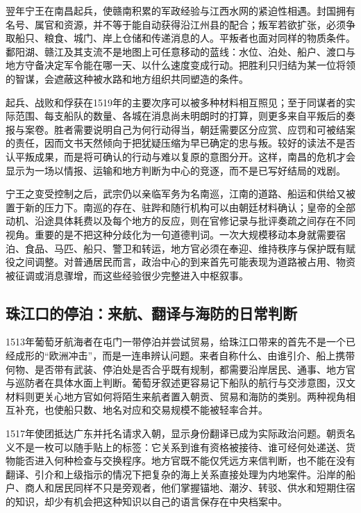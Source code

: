 翌年宁王在南昌起兵，使赣南积累的军政经验与江西水网的紧迫性相遇。封国拥有名号、属官和资源，并不等于能自动获得沿江州县的配合；叛军若欲扩张，必须争取船只、粮食、城门、岸上仓储和传递消息的人。平叛者也面对同样的物质条件。鄱阳湖、赣江及其支流不是地图上可任意移动的蓝线：水位、泊处、船户、渡口与地方守备决定军令能在哪一天、以什么速度变成行动。把胜利只归结为某一位将领的智谋，会遮蔽这种被水路和地方组织共同塑造的条件。

起兵、战败和俘获在1519年的主要次序可以被多种材料相互照见；至于同谋者的实际范围、每支船队的数量、各城在消息尚未明朗时的打算，则更多来自平叛后的奏报与案卷。胜者需要说明自己为何行动得当，朝廷需要区分应赏、应罚和可被结案的责任，因而文书天然倾向于把犹疑压缩为早已确定的忠与叛。较好的读法不是否认平叛成果，而是将可确认的行动与难以复原的意图分开。这样，南昌的危机才会显示为一场以情报、运输和地方判断为中心的竞逐，而不是已写好结局的戏剧。

宁王之变受控制之后，武宗仍以亲临军务为名南巡，江南的道路、船运和供给又被置于新的压力下。南巡的存在、驻跸和随行机构可以由朝廷材料确认；皇帝的全部动机、沿途具体耗费以及每个地方的反应，则在官修记录与批评奏疏之间存在不同视角。重要的是不把这种分歧化为一句道德判词。一次大规模移动本身就需要宿泊、食品、马匹、船只、警卫和转运，地方官必须在奉迎、维持秩序与保护既有赋役之间调整。对普通居民而言，政治中心的到来首先可能表现为道路被占用、物资被征调或消息骤增，而这些经验很少完整进入中枢叙事。

\subsection{珠江口的停泊：来航、翻译与海防的日常判断}

1513年葡萄牙航海者在屯门一带停泊并尝试贸易，给珠江口带来的首先不是一个已经成形的“欧洲冲击”，而是一连串辨认问题。来者自称什么、由谁引介、船上携带何物、是否带有武装、停泊处是否合乎既有规制，都需要沿岸居民、通事、地方官与巡防者在具体水面上判断。葡萄牙叙述更容易记下船队的航行与交涉意图，汉文材料则更关心地方官如何将陌生来航者置入朝贡、贸易和海防的类别。两种视角相互补充，也使船只数、地名对应和交易规模不能被轻率合并。

1517年使团抵达广东并托名请求入朝，显示身份翻译已成为实际政治问题。朝贡名义不是一枚可以随手贴上的标签：它关系到谁有资格被接待、谁可经何处递送、货物能否进入何种检查与交换程序。地方官既不能仅凭远方来信判断，也不能在没有翻译、引介和上级指示的情况下把复杂的海上关系直接处理为内地案件。沿岸的船户、商人和居民同样不只是旁观者，他们掌握锚地、潮汐、转驳、供水和短期住宿的知识，却少有机会把这种知识以自己的语言保存在中央档案中。

